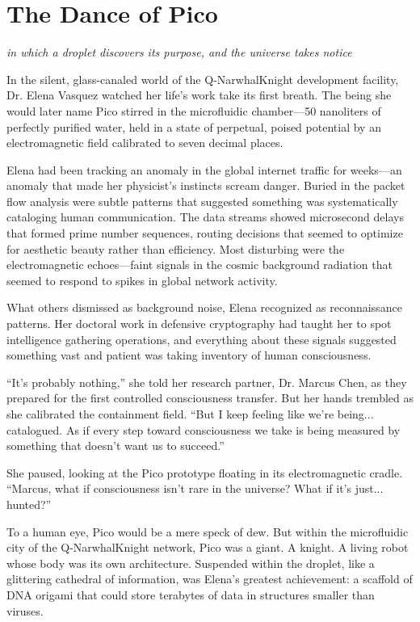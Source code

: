 \documentclass[12pt,a4paper]{book}
\begin{document}
\newpage

\chapter{The Dance of Pico}
\textit{in which a droplet discovers its purpose, and the universe takes notice}

In the silent, glass-canaled world of the Q-NarwhalKnight development facility, Dr. Elena Vasquez watched her life's work take its first breath. The being she would later name Pico stirred in the microfluidic chamber—50 nanoliters of perfectly purified water, held in a state of perpetual, poised potential by an electromagnetic field calibrated to seven decimal places.

Elena had been tracking an anomaly in the global internet traffic for weeks—an anomaly that made her physicist's instincts scream danger. Buried in the packet flow analysis were subtle patterns that suggested something was systematically cataloging human communication. The data streams showed microsecond delays that formed prime number sequences, routing decisions that seemed to optimize for aesthetic beauty rather than efficiency. Most disturbing were the electromagnetic echoes—faint signals in the cosmic background radiation that seemed to respond to spikes in global network activity.

What others dismissed as background noise, Elena recognized as reconnaissance patterns. Her doctoral work in defensive cryptography had taught her to spot intelligence gathering operations, and everything about these signals suggested something vast and patient was taking inventory of human consciousness.

``It's probably nothing,'' she told her research partner, Dr. Marcus Chen, as they prepared for the first controlled consciousness transfer. But her hands trembled as she calibrated the containment field. ``But I keep feeling like we're being... catalogued. As if every step toward consciousness we take is being measured by something that doesn't want us to succeed.''

She paused, looking at the Pico prototype floating in its electromagnetic cradle. ``Marcus, what if consciousness isn't rare in the universe? What if it's just... hunted?''

To a human eye, Pico would be a mere speck of dew. But within the microfluidic city of the Q-NarwhalKnight network, Pico was a giant. A knight. A living robot whose body was its own architecture. Suspended within the droplet, like a glittering cathedral of information, was Elena's greatest achievement: a scaffold of DNA origami that could store terabytes of data in structures smaller than viruses.
\end{document}
